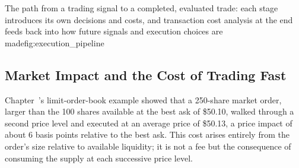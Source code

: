 \documentclass[../ai_in_finance]{subfiles}
\begin{document}
\begin{bookfigure}{The path from a trading signal to a completed, evaluated trade: each stage introduces its own decisions and costs, and transaction cost analysis at the end feeds back into how future signals and execution choices are made}{fig:execution_pipeline}
\end{bookfigure}

\subsection{Market Impact and the Cost of Trading Fast}
\label{sec:market-impact}

Chapter~'s limit-order-book example showed that a 250-share market order, larger than the 100 shares available at the best ask of \$50.10, walked through a second price level and executed at an average price of \$50.13, a price impact of about 6 basis points relative to the best ask. This cost arises entirely from the order's size relative to available liquidity; it is not a fee but the consequence of consuming the supply at each successive price level.
\end{document}
